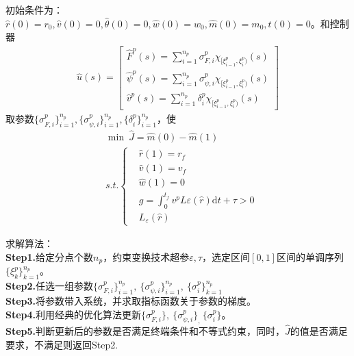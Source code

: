            初始条件为：$\hat{r}(0) = r_0,\hat{v}(0)=0,\hat{\theta}(0)=0,\hat{w}(0)=w_0,\hat{m}(0)=m_0,t(0)=0$。和控制器
            \begin{align*}
            \hat{u}(s) =
            \left[
            \begin{aligned}
            \hat{F}^p(s) = \sum_{i=1}^{n_p}\sigma_{F,i}^p\chi_{[\xi_{i-1}^p,\xi_i^p)}(s)\\
            \hat{\psi}^p(s) = \sum_{i=1}^{n_p}\sigma_{\psi,i}^p\chi_{[\xi_{i-1}^p,\xi_i^p)}(s)\\
            \hat{v}^p(s) = \sum_{i=1}^{n_p}\delta_i^p\chi_{[\xi_{i-1}^p,\xi_i^p)}(s)
            \end{aligned}
            \right]
            \end{align*}
            取参数$\{\sigma_{F,i}^p\}_{i=1}^{n_p},\{\sigma_{\psi,i}^p\}_{i=1}^{n_p},\{\delta_{i}^p\}_{i=1}^{n_p}$，使
            \begin{align*}
            & \min\ \hat{J} = \hat{m}(0) - \hat{m}(1)\\
            & s.t.\left\{\begin{aligned}
            & \hat{r}(1) = r_f\\
            & \hat{v}(1) = v_f\\
            & \hat{w}(1) = 0\\
            & g=\int_0^{t_f}v^pL\varepsilon(\hat{r})\mathrm{d}t+\tau >0\\
            & L_\varepsilon(\hat{r})
            \end{aligned}
            \right.
            \end{align*}
            \par
            求解算法：\\
            \textbf{Step1.}给定分点个数$n_p$，约束变换技术超参$\varepsilon,\tau$，选定区间$[0,1]$区间的单调序列$\{\xi_k^p\}_{k=1}^{n_p}$。\\
            \textbf{Step2.}任选一组参数$\{\sigma_{F,i}^p\}_{i=1}^{n_p},\ \{\sigma_{\psi,i}^p\}_{i=1}^{n_p},\ \{\sigma_i^p\}_{k=1}^{n_p}$\\
            \textbf{Step3.}将参数带入系统，并求取指标函数关于参数的梯度。\\
            \textbf{Step4.}利用经典的优化算法更新$\{\sigma_{F,i}^p\},\ \{\sigma_{\psi,i}^p\}_,\ \{\sigma_i^p\}$。\\
            \textbf{Step5.}判断更新后的参数是否满足终端条件和不等式约束，同时，$\hat{J}$的值是否满足要求，不满足则返回Step2.

